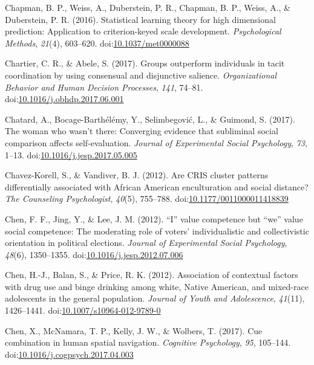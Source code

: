 \documentclass[english,man]{apa6}
\theoremstyle{definition}
\theoremstyle{definition}
\theoremstyle{definition}
\theoremstyle{remark}
\begin{document}
\hypertarget{ref-Chapman2016}{}
Chapman, B. P., Weiss, A., Duberstein, P. R., Chapman, B. P., Weiss, A.,
\& Duberstein, P. R. (2016). Statistical learning theory for high
dimensional prediction: Application to criterion-keyed scale
development. \emph{Psychological Methods}, \emph{21}(4), 603--620.
doi:\href{https://doi.org/10.1037/met0000088}{10.1037/met0000088}

\hypertarget{ref-Chartier2017}{}
Chartier, C. R., \& Abele, S. (2017). Groups outperform individuals in
tacit coordination by using consensual and disjunctive salience.
\emph{Organizational Behavior and Human Decision Processes}, \emph{141},
74--81.
doi:\href{https://doi.org/10.1016/j.obhdp.2017.06.001}{10.1016/j.obhdp.2017.06.001}

\hypertarget{ref-Chatard2017}{}
Chatard, A., Bocage-Barthélémy, Y., Selimbegović, L., \& Guimond, S.
(2017). The woman who wasn't there: Converging evidence that subliminal
social comparison affects self-evaluation. \emph{Journal of Experimental
Social Psychology}, \emph{73}, 1--13.
doi:\href{https://doi.org/10.1016/j.jesp.2017.05.005}{10.1016/j.jesp.2017.05.005}

\hypertarget{ref-Chavez-Korell2012}{}
Chavez-Korell, S., \& Vandiver, B. J. (2012). Are CRIS cluster patterns
differentially associated with African American enculturation and social
distance? \emph{The Counseling Psychologist}, \emph{40}(5), 755--788.
doi:\href{https://doi.org/10.1177/0011000011418839}{10.1177/0011000011418839}

\hypertarget{ref-Chen2012a}{}
Chen, F. F., Jing, Y., \& Lee, J. M. (2012). ``I'' value competence but
``we'' value social competence: The moderating role of voters'
individualistic and collectivistic orientation in political elections.
\emph{Journal of Experimental Social Psychology}, \emph{48}(6),
1350--1355.
doi:\href{https://doi.org/10.1016/j.jesp.2012.07.006}{10.1016/j.jesp.2012.07.006}

\hypertarget{ref-Chen2012}{}
Chen, H.-J., Balan, S., \& Price, R. K. (2012). Association of
contextual factors with drug use and binge drinking among white, Native
American, and mixed-race adolescents in the general population.
\emph{Journal of Youth and Adolescence}, \emph{41}(11), 1426--1441.
doi:\href{https://doi.org/10.1007/s10964-012-9789-0}{10.1007/s10964-012-9789-0}

\hypertarget{ref-Chen2017}{}
Chen, X., McNamara, T. P., Kelly, J. W., \& Wolbers, T. (2017). Cue
combination in human spatial navigation. \emph{Cognitive Psychology},
\emph{95}, 105--144.
doi:\href{https://doi.org/10.1016/j.cogpsych.2017.04.003}{10.1016/j.cogpsych.2017.04.003}
\end{document}
